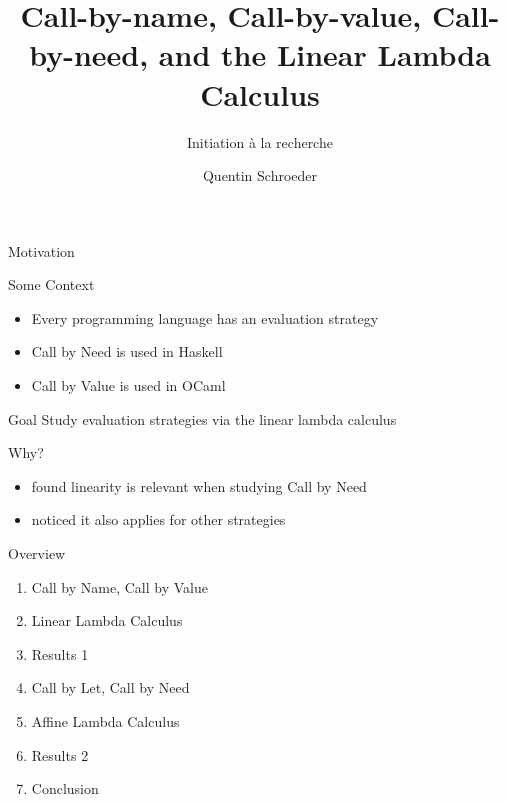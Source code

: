 \documentclass[10pt]{beamer}
\title{Call-by-name, Call-by-value, Call-by-need, and the Linear Lambda Calculus }
\subtitle{Initiation à la recherche}
\date{}
\author{Quentin Schroeder}
\institute{MPRI - Université Paris-Cité}
\begin{document}
\maketitle


\begin{frame}[fragile]{Motivation}
  \begin{alertblock}{Some Context}
    \begin{itemize}
      \item Every programming language has an evaluation strategy
      \item Call by Need is used in Haskell
      \item Call by Value is used in OCaml
    \end{itemize}

  \end{alertblock}

  \begin{alertblock}{Goal}
    Study evaluation strategies via the linear lambda calculus
  \end{alertblock}

  \begin{alertblock}{Why?}
    \begin{itemize}
      \item found linearity is relevant when studying Call by Need
      \item noticed it also applies for other strategies
    \end{itemize}
  \end{alertblock}
\end{frame}

\begin{frame}[fragile]{Overview}
  \begin{enumerate}
    \item Call by Name, Call by Value
    \item Linear Lambda Calculus
    \item Results 1
    \item Call by Let, Call by Need
    \item Affine Lambda Calculus
    \item Results 2
    \item Conclusion
  \end{enumerate}

\end{frame}



\end{document}
